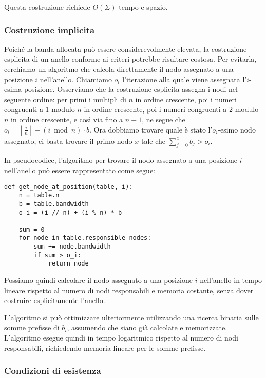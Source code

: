 Questa costruzione richiede $O(\Sigma)$ tempo e spazio.

\subsubsection{Costruzione implicita}
\label{subsubsec:costruzione-implicita}

Poiché la banda allocata può essere considerevolmente elevata, la costruzione esplicita di un anello conforme ai criteri potrebbe risultare costosa.
Per evitarla, cerchiamo un algoritmo che calcola direttamente il nodo assegnato a una posizione $i$ nell'anello.
Chiamiamo $o_i$ l'iterazione alla quale viene assegnata l'$i$-esima posizione.
Osserviamo che la costruzione esplicita assegna i nodi nel seguente ordine: per primi i multipli di $n$ in ordine crescente, poi i numeri congruenti a $1$ modulo $n$ in ordine crescente, poi i numeri congruenti a $2$ modulo $n$ in ordine crescente, e così via fino a $n-1$, ne segue che $\displaystyle o_i = \left\lfloor \frac{i}{n} \right\rfloor + (i \bmod n) \cdot b$.
Ora dobbiamo trovare quale è stato l'$o_i$-esimo nodo assegnato, ci basta trovare il primo nodo $x$ tale che $\displaystyle \sum_{j=0}^{x} b_j > o_i$.

In pseudocodice, l'algoritmo per trovare il nodo assegnato a una posizione $i$ nell'anello può essere rappresentato come segue:
\begin{verbatim}
def get_node_at_position(table, i):
    n = table.n
    b = table.bandwidth
    o_i = (i // n) + (i % n) * b

    sum = 0
    for node in table.responsible_nodes:
        sum += node.bandwidth
        if sum > o_i:
            return node
\end{verbatim}

Possiamo quindi calcolare il nodo assegnato a una posizione $i$ nell'anello in tempo lineare rispetto al numero di nodi responsabili e memoria costante, senza dover costruire esplicitamente l'anello.

L'algoritmo si può ottimizzare ulteriormente utilizzando una ricerca binaria sulle somme prefisse di $b_i$, assumendo che siano già calcolate e memorizzate.
L'algoritmo esegue quindi in tempo logaritmico rispetto al numero di nodi responsabili, richiedendo memoria lineare per le somme prefisse.

\subsubsection{Condizioni di esistenza}
\label{subsubsec:esistenza}

